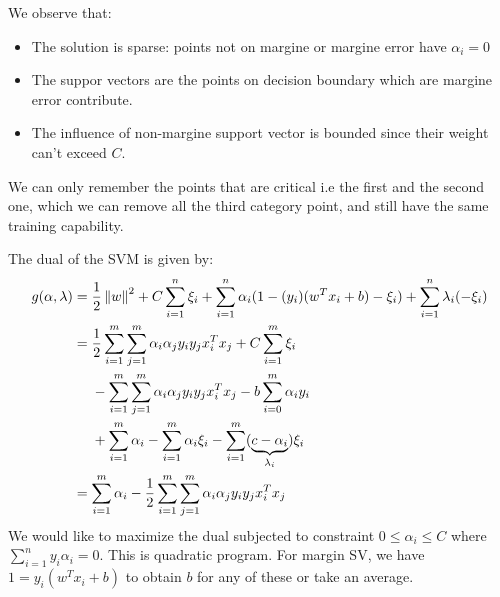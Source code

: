 \begin{remark}
    We observe that:
    \begin{itemize}
        \item The solution is sparse: points not on margine or margine error have $\alpha_i=0$
        \item The suppor vectors are the points on decision boundary which are margine error contribute.
        \item The influence of non-margine support vector is bounded since their weight can't exceed $C$.
    \end{itemize}
    We can only remember the points that are critical i.e the first and the second one, which we can remove all the third category point, and still have the same training capability. 
\end{remark}

\begin{proposition}
    The dual of the SVM is given by:
    \begin{equation*}
    \begin{aligned}
        g(\alpha, \lambda) &= \frac{1}{2}\left\lVert w\right\rVert^2 + C\sum^n_{i=1}\xi_i + \sum^n_{i=1}\alpha_i(1-(y_i)(w^Tx_i + b)-\xi_i) + \sum^n_{i=1}\lambda_i(-\xi_i) \\ 
        &= \begin{aligned}[t]
            &\frac{1}{2}\sum^m_{i=1}\sum^m_{j=1}\alpha_i\alpha_jy_iy_jx_i^Tx_j + C\sum^m_{i=1}\xi_i \\
            &-\sum^m_{i=1}\sum^m_{j=1}\alpha_i\alpha_jy_iy_jx_i^Tx_j-b\sum^m_{i=0}\alpha_iy_i \\
            &+\sum^m_{i=1}\alpha_i - \sum^m_{i=1}\alpha_i\xi_i - \sum^m_{i=1}(\underbrace{c-\alpha_i}_{\lambda_i})\xi_i
        \end{aligned} \\
        &= \sum^m_{i=1} \alpha_i - \frac{1}{2}\sum^m_{i=1}\sum^m_{j=1}\alpha_i\alpha_jy_iy_jx_i^Tx_j
    \end{aligned}
    \end{equation*}
    We would like to maximize the dual subjected to constraint $0\le\alpha_i\le C$ where $\sum^n_{i=1}y_i\alpha_i=0$. This is quadratic program. For margin SV, we have $1=y_i(w^Tx_i + b)$ to obtain $b$ for any of these or take an average.
\end{proposition}

